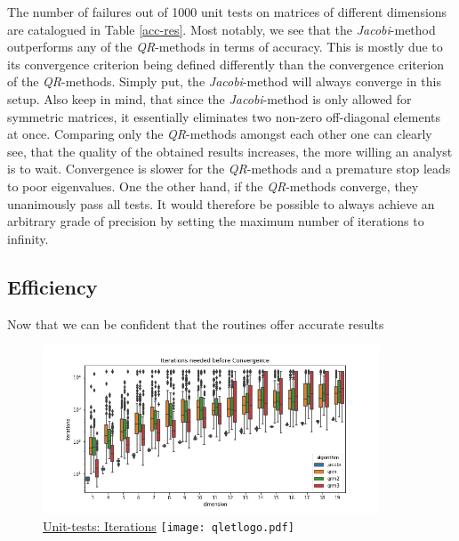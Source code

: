 \documentclass[12pt]{article}
\begin{document}
The number of failures out of 1000 unit tests on matrices of different dimensions are catalogued in Table \ref{acc-res}. Most notably, we see that the \textit{Jacobi}-method outperforms any of the \textit{QR}-methods in terms of accuracy. This is mostly due to its convergence criterion being defined differently than the convergence criterion of the \textit{QR}-methods. Simply put, the \textit{Jacobi}-method will always converge in this setup. Also keep in mind, that since the \textit{Jacobi}-method is only allowed for symmetric matrices, it essentially eliminates two non-zero off-diagonal elements at once. Comparing only the \textit{QR}-methods amongst each other one can clearly see, that the quality of the obtained results increases, the more willing an analyst is to wait. Convergence is slower for the \textit{QR}-methods and a premature stop leads to poor eigenvalues. One the other hand, if the \textit{QR}-methods converge, they unanimously pass all tests. It would therefore be possible to always achieve an arbitrary grade of precision by setting the maximum number of iterations to infinity.

\subsection{Efficiency}

Now that we can be confident that the routines offer accurate results

\begin{figure}
\centering
\caption{\href {https://github.com/thsis/NIS18/blob/master/tests/tests_eigen.py}{Unit-tests: Iterations}  \protect\texttt{[image: qletlogo.pdf]}}
  \includegraphics[width=\textwidth, height=5cm]{../media/plots/iterations_boxplot.png}
\end{figure}


\end{document}

